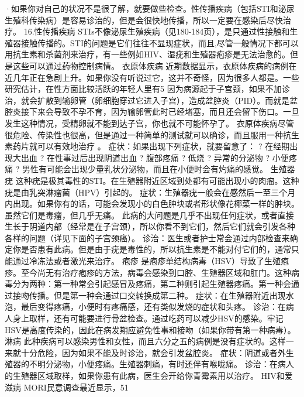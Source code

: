 \documentclass[12pt,UTF8]{ctexbook}
\begin{document}
·如果你对自己的状况不是很了解，就要做些检查。性传播疾病（包括STI和泌尿生殖科传染病）是容易诊治的，但是会很快地传播，所以一定要在感染后尽快治疗。
16.性传播疾病
STIs不像泌尿生殖疾病（见180-184页），是只通过性接触和生殖器接触传播的。STI的问题是它们往往不显现症状，而且,尽管一般情况下都可以用抗生素和杀菌剂来治疗，有一些例如HIV、湿疣和生殖器疱疹是无法治愈的。但是这些可以通过药物控制病情。
衣原体疾病
近期数据显示，衣原体疾病的病例在近几年正在急剧上升。如果你没有听说过它，这并不奇怪，因为很多人都是。一些研究估计，在性方面比较活跃的年轻人里有5%
因为病源起于子宫颈，如果不加诊治，就会扩散到输卵管（卵细胞穿过它进入子宫），造成盆腔炎（PID）。而就是盆腔炎接下来会导致不孕不育，因为输卵管此时已经堵塞，而且还会留下伤口。一旦发生这种情况，受精卵就不能到达子宫，你也就不可能怀孕了。
衣原体疾病尽管很危险、传染性也很高，但是通过一种简单的测试就可以确诊，而且服用一种抗生素药片就可以有效地治疗 。
症状：如果出现下列症状，就要留意了：
? 在经期出现大出血
? 在性事过后出现阴道出血
? 腹部疼痛
? 低烧
? 异常的分泌物
? 小便疼痛
? 男性有可能会出现少量乳状分泌物，而且在小便时会有灼痛的感觉。
生殖器疣
这种疣是极其毒性的STI。在生殖器附近区域到处都有可能出现小的肉瘤。这种疣是由乳突淋瘤菌（HPV）引起的。
症状：生殖器疣一般会在感然后一至三个月内出现。如果你有的话，可能会发现小的白色肿块或者形状像花椰菜一样的肿块。虽然它们是毒瘤，但几乎无痛。
此病的大问题是几乎不出现任何症状，或者直接生长于阴道内部（经常是在子宫颈），所以你看不到它们，然后它们就会引发各种各样的问题（详见下面的子宫颈癌）。
诊治：医生或者护士常会通过内部检查来确定你是否患有此病。但是由于疣是毒性的，所以抗生素是不能对付它们的，通常只能通过冷冻法或者激光来治疗。
疱疹
是疱疹单结构病毒（HSV）导致了生殖疱疹。至今尚无有治疗疱疹的方法，病毒会感染到口腔、生殖器区域和肛门。这种病毒分为两种：第一种常会引起感冒及疼痛，第二种则引起生殖器疼痛。第一种会通过接吻传播。但是第一种会通过口交转换成第二种。
症状：在生殖器附近出现水泡，最后变得疼痛，小便时有疼痛感，还有类似发烧的症状和头疼。
诊治：在病人身上取样，还有可能要进行骨盆检查。通过吃药可以减少HSV的感染。牢记HSV是高度传染的，因此在病发期应避免性事和接吻（如果你带有第一种病毒）。
淋病
此种疾病可以感染男性和女性，而且六分之五的病例是没有症状的。这样一来就十分危险，因为如果不能及时诊治，就会引发盆腔炎。
症状：阴道或者外生殖器的不明分泌物，小便疼痛。生殖器刺痛，有时还伴有喉咙痛。
诊治：在病人的生殖器区域取样，如果你患有此病，医生会开给你青霉素用以治疗。
HIV和爱滋病
MORI民意调查最近显示，51%
\end{document}
